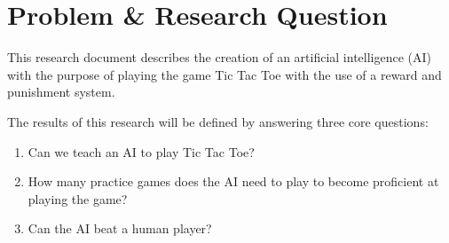 \section{Problem \& Research Question}

This research document describes the creation of an artificial intelligence (AI) with the purpose of playing the game Tic Tac Toe with the use of a reward and punishment system.

The results of this research will be defined by answering three core questions:

\begin{enumerate}
	\item Can we teach an AI to play Tic Tac Toe?
	\item How many practice games does the AI need to play to become proficient at playing the game?
	\item Can the AI beat a human player?
\end{enumerate}

